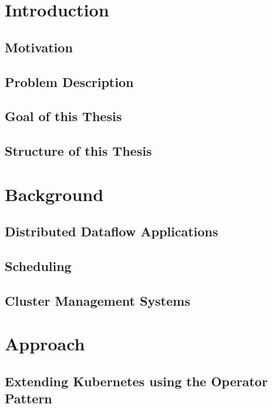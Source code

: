  





\chapter{Introduction}
\section{Motivation}

\section{Problem Description}

\section{Goal of this Thesis}

\section{Structure of this Thesis}



\chapter{Background}
\section{Distributed Dataflow Applications}

\section{Scheduling}

\section{Cluster Management Systems}


\chapter{Approach}

\section{Extending Kubernetes using the Operator Pattern}

